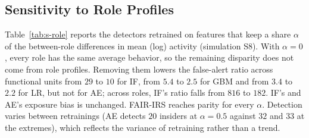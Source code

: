 \documentclass[10pt,onecolumn,letterpaper]{article}
\begin{document}
\subsection{Sensitivity to Role Profiles}
Table~\ref{tab:s-role} reports the detectors retrained on features that keep a share $\alpha$ of the between-role differences in mean (log) activity (simulation S8). With $\alpha=0$, every role has the same average behavior, so the remaining disparity does not come from role profiles. Removing them lowers the false-alert ratio across functional units from $29$ to $10$ for IF, from $5.4$ to $2.5$ for GBM and from $3.4$ to $2.2$ for LR, but not for AE; across roles, IF's ratio falls from $816$ to $182$. IF's and AE's exposure bias is unchanged. FAIR-IRS reaches parity for every $\alpha$. Detection varies between retrainings (AE detects $20$ insiders at $\alpha=0.5$ against $32$ and $33$ at the extremes), which reflects the variance of retraining rather than a trend.

\begin{table}[!t]
\caption{Detectors Retrained With a Share $\alpha$ of the Between-Role Differences in Mean Activity (r4.2; FU: Functional Units)\label{tab:s-role}}
\centering
{}
\end{table}
\end{document}
